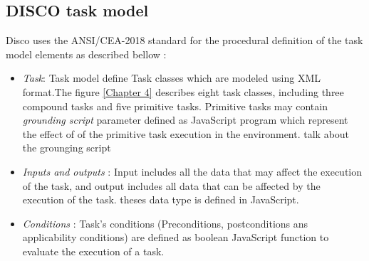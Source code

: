 \subsection{DISCO task model}
Disco uses the ANSI/CEA-2018 standard for the procedural definition of the task model elements as described bellow :
 \begin{itemize}
\item \textit{Task}: Task model define Task classes which are modeled using XML format.The figure \ref{Chapter 4} describes eight task classes, including three compound tasks and  five primitive tasks. Primitive tasks may contain \textit{grounding script} parameter defined as JavaScript program which represent the effect of of the primitive task execution in the environment.
talk about the grounging script
\item \textit{Inputs and outputs} : Input includes all the data that may affect the execution of the task, and output includes all data that can be affected by the execution of the task. theses data type is defined in JavaScript.
\item \textit{Conditions} : Task's conditions (Preconditions, postconditions ans applicability conditions) are defined as boolean JavaScript function to evaluate the execution of a task.
	
 \end{itemize}	


